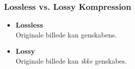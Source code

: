\subsubsection{Lossless vs. Lossy Kompression}

\begin{itemize}
	\item \textbf{Lossless}\\
	Originale billede kan genskabens. 
	
	\item \textbf{Lossy}\\
	Originale billede kan \textit{ikke} genskabes.
\end{itemize}
